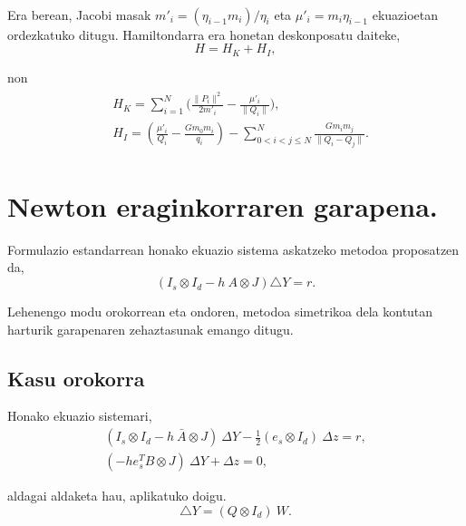\paragraph*{}Era berean, Jacobi masak $m'_i=(\eta_{i-1} m_i)/\eta_i$ eta $\mu'_i=m_i \eta_{i-1}$ ekuazioetan ordezkatuko ditugu. Hamiltondarra era honetan deskonposatu daiteke,
\begin{equation*}
H=H_K+H_I,
\end{equation*} 

non
\begin{align*}
\begin{split}
&H_K=\sum\limits_{i=1}^{N}\bigg(\frac{\|P_i\|^2}{2 m'_i} -\frac{\mu'_i}{\|Q_i\|}\bigg), \\
&H_I=\left(\frac{\mu'_i}{Q_i}-\frac{Gm_0m_i}{q_i} \right) -\sum\limits_{0< i<j\le N}^{N} \frac{G m_i m_j}{\|Q_i-Q_j\|}.
\end{split}
\end{align*}

\section{Newton eraginkorraren garapena.}
\label{erans:B3}

Formulazio estandarrean honako ekuazio sistema askatzeko metodoa proposatzen da,
\begin{equation}
\label{eqA3:1}
(I_s \otimes I_d- h \ A \otimes J) \triangle Y =r.
\end{equation}

Lehenengo modu orokorrean eta ondoren, metodoa simetrikoa dela kontutan harturik garapenaren zehaztasunak emango ditugu.

\subsection*{Kasu orokorra}
\label{serans:B31}

Honako ekuazio sistemari,
\begin{align}
\label{eqA3:2}
(I_s \otimes I_d- h \ \bar{A} \otimes J) \ \Delta Y - \frac{1}{2}(e_s \otimes I_d) \ \Delta z =r,\\
(-h e_s^T B \otimes J) \ \Delta Y+  \Delta z=0,
\end{align}

aldagai aldaketa hau,  aplikatuko doigu.
\begin{equation}
\label{eqA3:3}
 \triangle Y = (Q \otimes I_d) \ W.
\end{equation}

